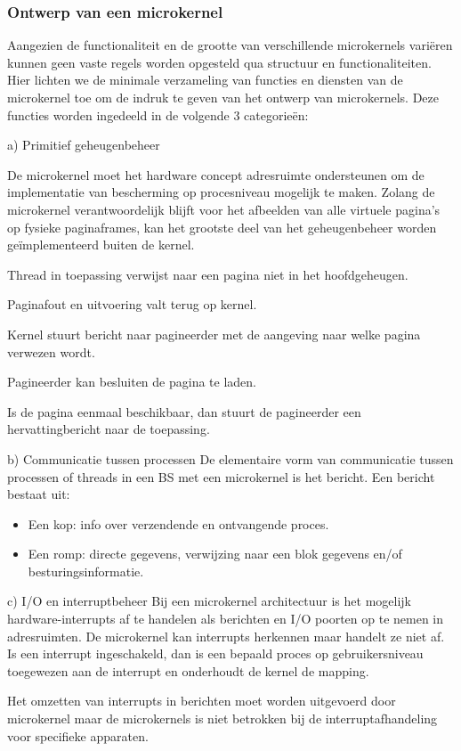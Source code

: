 \subsubsection{Ontwerp van een microkernel}

Aangezien de functionaliteit en de grootte van verschillende microkernels variëren kunnen geen vaste regels worden opgesteld qua structuur en functionaliteiten. Hier lichten we de minimale verzameling van functies en diensten van de microkernel toe om de indruk te geven van het ontwerp van microkernels. Deze functies worden ingedeeld in de volgende 3 categorieën:

a)	Primitief geheugenbeheer

De microkernel moet het hardware concept adresruimte ondersteunen om de implementatie van bescherming op procesniveau mogelijk te maken. Zolang de microkernel verantwoordelijk blijft voor het afbeelden van alle virtuele pagina’s op fysieke paginaframes, kan het grootste deel van het geheugenbeheer worden geïmplementeerd buiten de kernel.

Thread in toepassing verwijst naar een pagina niet in het hoofdgeheugen.

Paginafout en uitvoering valt terug op kernel.

Kernel stuurt bericht naar pagineerder met de aangeving naar welke pagina verwezen wordt.

Pagineerder kan besluiten de pagina te laden.

Is de pagina eenmaal beschikbaar, dan stuurt de pagineerder een hervattingbericht naar de toepassing.

b)	Communicatie tussen processen
De elementaire vorm van communicatie tussen processen of threads in een BS met een microkernel is het bericht. Een bericht bestaat uit:

\begin{itemize}
\item Een kop: info over verzendende en ontvangende proces.
\item Een romp: directe gegevens, verwijzing naar een blok gegevens en/of besturingsinformatie.
\end{itemize}

c)	I/O en interruptbeheer
Bij een microkernel architectuur is het mogelijk hardware-interrupts af te handelen als berichten en I/O poorten op te nemen in adresruimten. De microkernel kan interrupts herkennen maar handelt ze niet af. Is een interrupt ingeschakeld, dan is een bepaald proces op gebruikersniveau toegewezen aan de interrupt en onderhoudt de kernel de mapping.

Het omzetten van interrupts in berichten moet worden uitgevoerd door microkernel maar de microkernels is niet betrokken bij de interruptafhandeling voor specifieke apparaten.
